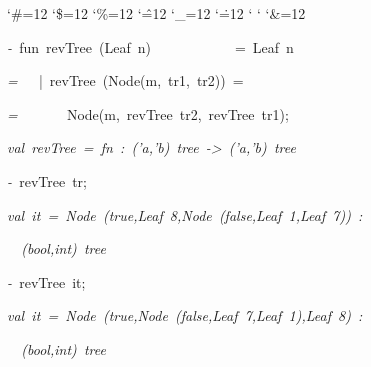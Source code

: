 \begin{list}{}
{\setlength{\leftmargin}{\leftmargini}
\setlength{\rightmargin}{0cm}
\setlength{\itemindent}{0cm}
\setlength{\listparindent}{0cm}
\setlength{\itemsep}{0cm}
\setlength{\parsep}{0cm}
\setlength{\labelsep}{0cm}
\setlength{\labelwidth}{0cm}
\catcode`\#=12
\catcode`\$=12
\catcode`\%=12
\catcode`\^=12
\catcode`\_=12
\catcode`\.=12
\catcode`
\catcode`
\catcode`\&=12
\ttfamily}
\small
\item[]\textsl{-\ }fun\ revTree\ (Leaf\ n)\ \ \ \ \ \ \ \ \ \ \ \ =\ Leaf\ n
\item[]\textsl{=\ }\ \ |\ revTree\ (Node(m,\ tr1,\ tr2))\ =
\item[]\textsl{=\ }\ \ \ \ \ \ Node(m,\ revTree\ tr2,\ revTree\ tr1);
\item[]\textsl{val\ revTree\ =\ fn\ :\ ('a,'b)\ tree\ ->\ ('a,'b)\ tree}
\item[]\textsl{-\ }revTree\ tr;
\item[]\textsl{val\ it\ =\ Node\ (true,Leaf\ 8,Node\ (false,Leaf\ 1,Leaf\ 7))\ :}
\item[]\textsl{\ \ (bool,int)\ tree}
\item[]\textsl{-\ }revTree\ it;
\item[]\textsl{val\ it\ =\ Node\ (true,Node\ (false,Leaf\ 7,Leaf\ 1),Leaf\ 8)\ :}
\item[]\textsl{\ \ (bool,int)\ tree}
\end{list}

